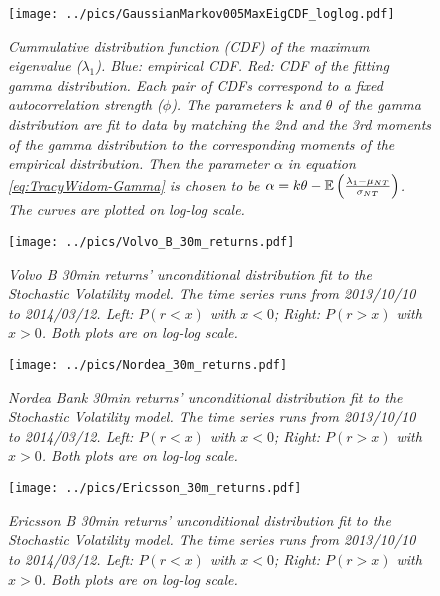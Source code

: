 \documentclass{report}
\begin{document}
\begin{figure}
  \begin{center}
    \texttt{[image: ../pics/GaussianMarkov005MaxEigCDF\_loglog.pdf]}
  \end{center}
  \caption{\small \it Cummulative distribution function (CDF) of the maximum
    eigenvalue ($\lambda_1$). Blue: empirical CDF. Red: CDF of the
    fitting gamma distribution. Each pair of CDFs correspond to a
    fixed autocorrelation strength ($\phi$). The parameters $k$ and
    $\theta$ of the gamma distribution are fit to data by matching the
    2nd and the 3rd moments of the gamma distribution to the
    corresponding moments of the empirical distribution. Then the
    parameter $\alpha$ in equation \ref{eq:TracyWidom-Gamma} is chosen
    to be $\alpha = k\theta - \mathbb{E}\left({\lambda_1 - \mu_{NT} \over
        \sigma_{NT}}\right)$. The curves are plotted on log-log
    scale.}
  \label{fig:GaussianMarkov005MaxEigCDF_loglog}
\end{figure}

\begin{figure}[htb!]
  \centering
  \texttt{[image: ../pics/Volvo\_B\_30m\_returns.pdf]}
  \caption{\small \it Volvo B 30min returns' unconditional distribution fit to
    the Stochastic Volatility model. The time series runs from
    2013/10/10 to 2014/03/12. Left: $P(r < x)$ with $x < 0$; Right:
    $P(r > x)$ with $x > 0$. Both plots are on log-log scale.}
  \label{fig:Volvo_B_30m_returns}
\end{figure}

\begin{figure}[htb!]
  \centering
  \texttt{[image: ../pics/Nordea\_30m\_returns.pdf]}
  \caption{\small \it Nordea Bank 30min returns' unconditional
    distribution fit to the Stochastic Volatility model. The time
    series runs from 2013/10/10 to 2014/03/12. Left: $P(r < x)$ with
    $x < 0$; Right: $P(r > x)$ with $x > 0$. Both plots are on log-log scale.}
  \label{fig:Nordea_30m_returns}
\end{figure}

\begin{figure}[htb!]
  \centering
  \texttt{[image: ../pics/Ericsson\_30m\_returns.pdf]}
  \caption{\small \it Ericsson B 30min returns' unconditional
    distribution fit to the Stochastic Volatility model. The time
    series runs from 2013/10/10 to 2014/03/12. Left: $P(r < x)$ with
    $x < 0$; Right: $P(r > x)$ with $x > 0$. Both plots are on log-log scale.}
  \label{fig:Ericsson_30m_returns}
\end{figure}
\end{document}
